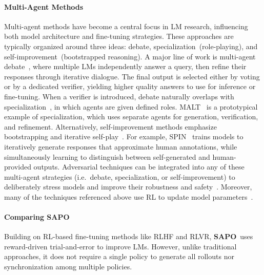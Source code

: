 \documentclass[11pt, a4paper, logo, singlecolumn, copyright]{gensyn}
\newcommand{\SAPO}{\textbf{SAPO}}
\begin{document}
\paragraph{Multi-Agent Methods}
Multi-agent methods have become a central focus in LM research, influencing both model architecture and fine-tuning strategies. These approaches are typically organized around three ideas: debate, specialization~(role-playing), and self-improvement~(bootstrapped reasoning). A major line of work is multi-agent debate~\citep{wu2023autogenenablingnextgenllm,du2023improvingfactualityreasoninglanguage,li2024improvingmultiagentdebatesparse, khan2024debatingwithmorepersuasivellms,liang2024encouragingdivergentthinkinglarge}, where multiple LMs independently answer a query, then refine their responses through iterative dialogue. The final output is selected either by voting or by a dedicated verifier, yielding higher quality answers to use for inference or fine-tuning. When a verifier is introduced, debate naturally overlaps with specialization~\citep{subramaniam2025multiagentfinetuningselfimprovement,park2025maporlmultiagentpostcotrainingcollaborative,li2023camelcommunicativeagents,ma2024coevolvingwithotheryou}, in which agents are given defined roles. MALT~\citep{motwani2025maltimprovingreasoningmultiagent} is a prototypical example of specialization, which uses separate agents for generation, verification, and refinement. Alternatively, self-improvement methods emphasize bootstrapping and iterative self-play~\citep{chen2024selfplayfinetuningconvertsweak,zhao2025siriusselfimprovingmultiagentsystems}. For example, SPIN~\citep{chen2024selfplayfinetuningconvertsweak} trains models to iteratively generate responses that approximate human annotations, while simultaneously learning to distinguish between self-generated and human-provided outputs. Adversarial techniques can be integrated into any of these multi-agent strategies (i.e.~debate, specialization, or self-improvement) to deliberately stress models and improve their robustness and safety~\citep{perez2022redteaminglanguagemodels}. Moreover, many of the techniques referenced above use RL to update model parameters~\citep{wu2025llamarldistributedasynchronousreinforcement,ma2024coevolvingwithotheryou,park2025maporlmultiagentpostcotrainingcollaborative,liao2025marftmultiagentreinforcementfinetuning,liu2025llmcollaborationmultiagentreinforcement}.

\paragraph{Comparing SAPO}
Building on RL-based fine-tuning methods like RLHF and RLVR, \SAPO~uses reward-driven trial-and-error to improve LMs. However, unlike traditional approaches, it does not require a single policy to generate all rollouts nor synchronization among multiple policies. 
\end{document}
